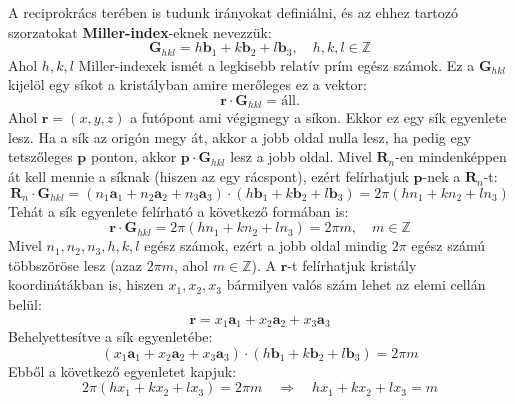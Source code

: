 \documentclass[../main.tex]{subfiles}
\begin{document}
A reciprokrács terében is tudunk irányokat definiálni, és az ehhez tartozó szorzatokat \textbf{Miller-index}-eknek nevezzük:
\begin{equation}
    \mathbf{G}_{hkl} = h \mathbf{b}_1 + k \mathbf{b}_2 + l \mathbf{b}_3, \quad h,k,l \in \mathbb{Z}
\end{equation}
Ahol $h, k, l$ Miller-indexek ismét a legkisebb relatív prím egész számok. Ez a $\mathbf{G}_{hkl}$ kijelöl egy síkot a kristályban amire merőleges ez a vektor:
\begin{equation}
    \mathbf{r} \cdot \mathbf{G}_{hkl} = \text{áll.}
\end{equation}
Ahol $\mathbf{r} = (x,y,z)$ a futópont ami végigmegy a síkon. Ekkor ez egy sík egyenlete lesz. Ha a sík az origón megy át, akkor a jobb oldal nulla lesz, ha pedig egy tetszőleges $\mathbf{p}$ ponton, akkor $\mathbf{p} \cdot \mathbf{G}_{hkl}$ lesz a jobb oldal.
Mivel $\mathbf{R}_n$-en mindenképpen át kell mennie a síknak (hiszen az egy rácspont), ezért felírhatjuk $\mathbf{p}$-nek a $\mathbf{R}_n$-t:
\begin{equation}
    \mathbf{R}_n \cdot \mathbf{G}_{hkl} = (n_1 \mathbf{a}_1 + n_2 \mathbf{a}_2 + n_3 \mathbf{a}_3) \cdot (h \mathbf{b}_1 + k \mathbf{b}_2 + l \mathbf{b}_3) = 2 \pi (h n_1 + k n_2 + l n_3)
\end{equation}
Tehát a sík egyenlete felírható a következő formában is:
\begin{equation}
    \mathbf{r} \cdot \mathbf{G}_{hkl} = 2 \pi (h n_1 + k n_2 + l n_3) = 2 \pi m, \quad m \in \mathbb{Z}
\end{equation}
Mivel $n_1, n_2, n_3, h, k, l$ egész számok, ezért a jobb oldal mindig $2 \pi$ egész számú többszöröse lesz (azaz $2 \pi m$, ahol $m \in \mathbb{Z}$). A $\mathbf{r}$-t felírhatjuk kristály koordinátákban is, hiszen $x_1, x_2, x_3$ bármilyen valós szám lehet az elemi cellán belül:
\begin{equation}
    \mathbf{r} = x_1 \mathbf{a}_1 + x_2 \mathbf{a}_2 + x_3 \mathbf{a}_3
\end{equation}
Behelyettesítve a sík egyenletébe:
\begin{equation}
    (x_1 \mathbf{a}_1 + x_2 \mathbf{a}_2 + x_3 \mathbf{a}_3) \cdot (h \mathbf{b}_1 + k \mathbf{b}_2 + l \mathbf{b}_3) = 2 \pi m
\end{equation}
Ebből a következő egyenletet kapjuk:
\begin{equation}
    2 \pi (h x_1 + k x_2 + l x_3) = 2 \pi m \quad \Rightarrow \quad h x_1 + k x_2 + l x_3 = m
\end{equation}
\end{document}
